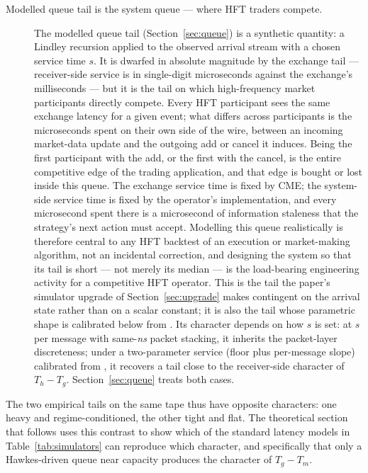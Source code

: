 \documentclass[11pt]{article}
\begin{document}
\begin{description}
\item[Modelled queue tail is the system queue --- where HFT traders compete.] The modelled queue tail (Section~\ref{sec:queue}) is a synthetic quantity: a Lindley recursion applied to the observed arrival stream with a chosen service time $s$. It is dwarfed in absolute magnitude by the exchange tail --- receiver-side service is in single-digit microseconds against the exchange's milliseconds --- but it is the tail on which high-frequency market participants directly compete. Every HFT participant sees the same exchange latency for a given event; what differs across participants is the microseconds spent on their own side of the wire, between an incoming market-data update and the outgoing add or cancel it induces. Being the first participant with the add, or the first with the cancel, is the entire competitive edge of the trading application, and that edge is bought or lost inside this queue. The exchange service time is fixed by CME; the system-side service time is fixed by the operator's implementation, and every microsecond spent there is a microsecond of information staleness that the strategy's next action must accept. Modelling this queue realistically is therefore central to any HFT backtest of an execution or market-making algorithm, not an incidental correction, and designing the system so that its tail is short --- not merely its median --- is the load-bearing engineering activity for a competitive HFT operator. This is the tail the paper's simulator upgrade of Section~\ref{sec:upgrade} makes contingent on the arrival state rather than on a scalar constant; it is also the tail whose parametric shape is calibrated below from \citet{mayeski_actorhft}. Its character depends on how $s$ is set: at $s$ per message with same-\emph{ns} packet stacking, it inherits the packet-layer discreteness; under a two-parameter service (floor plus per-message slope) calibrated from \citet{mayeski_actorhft}, it recovers a tail close to the receiver-side character of $T_h - T_g$. Section~\ref{sec:queue} treats both cases.
\end{description}

The two empirical tails on the same tape thus have opposite characters: one heavy and regime-conditioned, the other tight and flat. The theoretical section that follows uses this contrast to show which of the standard latency models in Table~\ref{tab:simulators} can reproduce which character, and specifically that only a Hawkes-driven queue near capacity produces the character of $T_g - T_m$.
\end{document}
